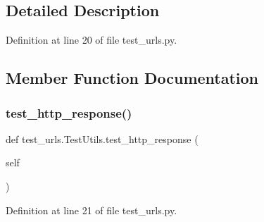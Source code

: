 \subsection{Detailed Description}


Definition at line 20 of file test\+\_\+urls.\+py.



\subsection{Member Function Documentation}
\mbox{\label{classtest__urls_1_1TestUtils_a5575b932cdbb76885c5c325f91b098ff}} 
\subsubsection{\texorpdfstring{test\+\_\+http\+\_\+response()}{test\_http\_response()}}
{\footnotesize\ttfamily def test\+\_\+urls.\+Test\+Utils.\+test\+\_\+http\+\_\+response (\begin{DoxyParamCaption}\item[{}]{self }\end{DoxyParamCaption})}



Definition at line 21 of file test\+\_\+urls.\+py.


